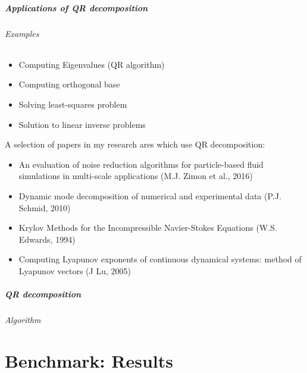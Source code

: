 \begin{frame}
\frametitle{Applications of QR decomposition}
\framesubtitle{Examples}
\begin{itemize}
 \item Computing Eigenvalues (QR algorithm)
 \item Computing orthogonal base 
 \item Solving least-squares problem
 \item Solution to linear inverse problems
\end{itemize}
A selection of papers in my research ares which use QR decomposition:
\begin{itemize}
 \item An evaluation of noise reduction algorithms for particle-based fluid simulations in multi-scale applications (M.J. Zimon et al., 2016)
 \item Dynamic mode decomposition of numerical and experimental data (P.J. Schmid, 2010)
 \item Krylov Methods for the Incompressible Navier-Stokes Equations (W.S. Edwards, 1994)
 \item Computing Lyapunov exponents of continuous dynamical systems: method of Lyapunov vectors (J Lu, 2005)
\end{itemize}
\end{frame}

\begin{frame}
\frametitle{QR decomposition}
\framesubtitle{Algorithm}
\end{frame}

\part{Benchmark: Results}
\makepart

